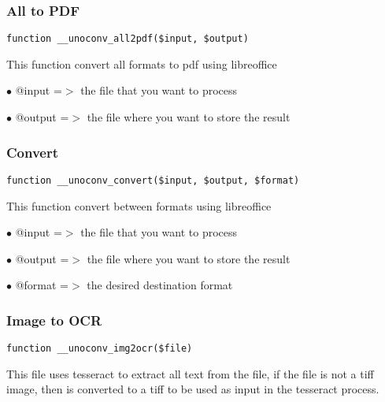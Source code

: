 \documentclass[a4paper]{article}
\begin{document}
\hypertarget{toc539}{}
\subsubsection{All to PDF}

\begin{lstlisting}
function __unoconv_all2pdf($input, $output)
\end{lstlisting}

This function convert all formats to pdf using libreoffice

\begin{compactitem}
\item[\color{myblue}$\bullet$] @input  =$>$ the file that you want to process
\item[\color{myblue}$\bullet$] @output =$>$ the file where you want to store the result
\end{compactitem}

\hypertarget{toc540}{}
\subsubsection{Convert}

\begin{lstlisting}
function __unoconv_convert($input, $output, $format)
\end{lstlisting}

This function convert between formats using libreoffice

\begin{compactitem}
\item[\color{myblue}$\bullet$] @input  =$>$ the file that you want to process
\item[\color{myblue}$\bullet$] @output =$>$ the file where you want to store the result
\item[\color{myblue}$\bullet$] @format =$>$ the desired destination format
\end{compactitem}

\hypertarget{toc541}{}
\subsubsection{Image to OCR}

\begin{lstlisting}
function __unoconv_img2ocr($file)
\end{lstlisting}

This file uses tesseract to extract all text from the file, if the file
is not a tiff image, then is converted to a tiff to be used as input in
the tesseract process.
\end{document}
